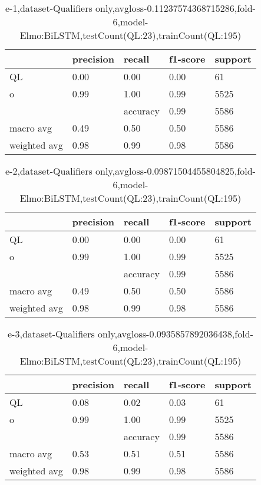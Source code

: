 \begin{table}[!ht] 
\centering
\caption{e-1,dataset-Qualifiers only,avgloss-0.11237574368715286,fold-6,model-Elmo:BiLSTM,testCount(QL:23),trainCount(QL:195)}\label{e-1data-qualS.tsv}
\begin{tabularx}{300pt}{|X|X|X|X|X|}
\hline
&precision&recall&f1-score&support\\
\hline
QL&0.00&0.00&0.00&61\\
\hline
o&0.99&1.00&0.99&5525\\
\hline
&&accuracy&0.99&5586\\
\hline
macro avg&0.49&0.50&0.50&5586\\
\hline
weighted avg&0.98&0.99&0.98&5586\\
\hline
\end{tabularx}
\end{table}
\begin{table}[!ht] 
\centering
\caption{e-2,dataset-Qualifiers only,avgloss-0.09871504455804825,fold-6,model-Elmo:BiLSTM,testCount(QL:23),trainCount(QL:195)}\label{e-2data-qualS.tsv}
\begin{tabularx}{300pt}{|X|X|X|X|X|}
\hline
&precision&recall&f1-score&support\\
\hline
QL&0.00&0.00&0.00&61\\
\hline
o&0.99&1.00&0.99&5525\\
\hline
&&accuracy&0.99&5586\\
\hline
macro avg&0.49&0.50&0.50&5586\\
\hline
weighted avg&0.98&0.99&0.98&5586\\
\hline
\end{tabularx}
\end{table}
\begin{table}[!ht] 
\centering
\caption{e-3,dataset-Qualifiers only,avgloss-0.0935857892036438,fold-6,model-Elmo:BiLSTM,testCount(QL:23),trainCount(QL:195)}\label{e-3data-qualS.tsv}
\begin{tabularx}{300pt}{|X|X|X|X|X|}
\hline
&precision&recall&f1-score&support\\
\hline
QL&0.08&0.02&0.03&61\\
\hline
o&0.99&1.00&0.99&5525\\
\hline
&&accuracy&0.99&5586\\
\hline
macro avg&0.53&0.51&0.51&5586\\
\hline
weighted avg&0.98&0.99&0.98&5586\\
\hline
\end{tabularx}
\end{table}
